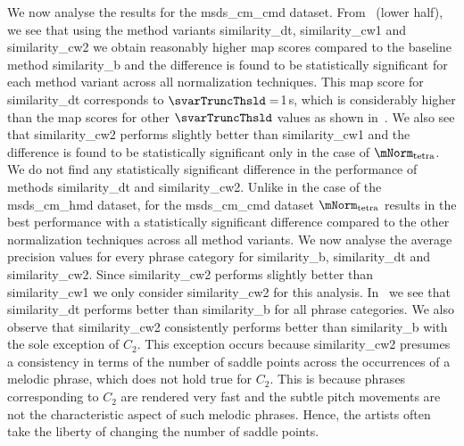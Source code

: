 We now analyse the results for the \acrshort{msds_cm_cmd} dataset. From~ (lower half), we see that using the method variants \acrshort{similarity_dt}, \acrshort{similarity_cw1} and \acrshort{similarity_cw2} we obtain reasonably higher \gls{map} scores compared to the baseline method \acrshort{similarity_b} and the difference is found to be statistically significant for each method variant across all normalization techniques. This \gls{map} score for \acrshort{similarity_dt} corresponds to $\svarTruncThsld=$1\,s, which is considerably higher than the \gls{map} scores for other $\svarTruncThsld$ values as shown in~. We also see that \acrshort{similarity_cw2} performs slightly better than \acrshort{similarity_cw1} and the difference is found to be statistically significant only in the case of $\mNorm_\mathrm{tetra}$. We do not find any statistically significant difference in the performance of methods \acrshort{similarity_dt} and \acrshort{similarity_cw2}. Unlike in the case of the \acrshort{msds_cm_hmd} dataset, for the \acrshort{msds_cm_cmd} dataset $\mNorm_\mathrm{tetra}$ results in the best performance with a statistically significant difference compared to the other normalization techniques across all method variants. We now analyse the average precision values for every phrase category for \acrshort{similarity_b}, \acrshort{similarity_dt} and \acrshort{similarity_cw2}. Since \acrshort{similarity_cw2} performs slightly better than \acrshort{similarity_cw1} we only consider \acrshort{similarity_cw2} for this analysis. In~ we see that \acrshort{similarity_dt} performs better than \acrshort{similarity_b} for all phrase categories. We also observe that \acrshort{similarity_cw2} consistently performs better than \acrshort{similarity_b} with the sole exception of $C_2$. This exception occurs because \acrshort{similarity_cw2} presumes a consistency in terms of the number of saddle points across the occurrences of a melodic phrase, which does not hold true for $C_2$. This is because phrases corresponding to $C_2$ are rendered very fast and the subtle pitch movements are not the characteristic aspect of such melodic phrases. Hence, the artists often take the liberty of changing the number of saddle points. 

